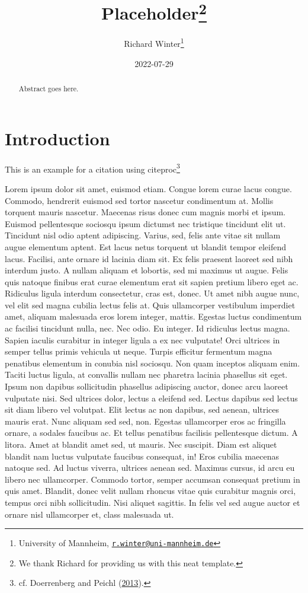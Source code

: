 \documentclass[
  12pt,
]{article}
\title{Placeholder\footnote{We thank Richard for providing us with this neat template.}}
\author{Richard Winter\footnote{University of Mannheim, \href{mailto:r.winter@uni-mannheim.de}{\nolinkurl{r.winter@uni-mannheim.de}}}}
\date{2022-07-29}
\begin{document}
\maketitle
\begin{abstract}
Abstract goes here.
\end{abstract}

\newpage

\hypertarget{intro}{%
\section{Introduction}\label{intro}}

This is an example for a citation using citeproc\footnote{cf. Doerrenberg and Peichl (\protect\hyperlink{ref-doerrenberg2013progressive}{2013}).}

Lorem ipsum dolor sit amet, euismod etiam. Congue lorem curae lacus congue. Commodo, hendrerit euismod sed tortor nascetur condimentum at. Mollis torquent mauris nascetur. Maecenas risus donec cum magnis morbi et ipsum. Euismod pellentesque sociosqu ipsum dictumst nec tristique tincidunt elit ut. Tincidunt nisl odio aptent adipiscing. Varius, sed, felis ante vitae sit nullam augue elementum aptent. Est lacus netus torquent ut blandit tempor eleifend lacus. Facilisi, ante ornare id lacinia diam sit. Ex felis praesent laoreet sed nibh interdum justo. A nullam aliquam et lobortis, sed mi maximus ut augue. Felis quis natoque finibus erat curae elementum erat sit sapien pretium libero eget ac. Ridiculus ligula interdum consectetur, cras est, donec. Ut amet nibh augue nunc, vel elit sed magna cubilia lectus felis at. Quis ullamcorper vestibulum imperdiet amet, aliquam malesuada eros lorem integer, mattis. Egestas luctus condimentum ac facilisi tincidunt nulla, nec. Nec odio. Eu integer. Id ridiculus lectus magna. Sapien iaculis curabitur in integer ligula a ex nec vulputate! Orci ultrices in semper tellus primis vehicula ut neque. Turpis efficitur fermentum magna penatibus elementum in conubia nisl sociosqu. Non quam inceptos aliquam enim. Taciti luctus ligula, at convallis nullam nec pharetra lacinia phasellus sit eget. Ipsum non dapibus sollicitudin phasellus adipiscing auctor, donec arcu laoreet vulputate nisi. Sed ultrices dolor, lectus a eleifend sed. Lectus dapibus sed lectus sit diam libero vel volutpat. Elit lectus ac non dapibus, sed aenean, ultrices mauris erat. Nunc aliquam sed sed, non. Egestas ullamcorper eros ac fringilla ornare, a sodales faucibus ac. Et tellus penatibus facilisis pellentesque dictum. A litora. Amet at blandit amet sed, ut mauris. Nec suscipit. Diam est aliquet blandit nam luctus vulputate faucibus consequat, in! Eros cubilia maecenas natoque sed. Ad luctus viverra, ultrices aenean sed. Maximus cursus, id arcu eu libero nec ullamcorper. Commodo tortor, semper accumsan consequat pretium in quis amet. Blandit, donec velit nullam rhoncus vitae quis curabitur magnis orci, tempus orci nibh sollicitudin. Nisi aliquet sagittis. In felis vel sed augue auctor et ornare nisl ullamcorper et, class malesuada ut.
\end{document}
